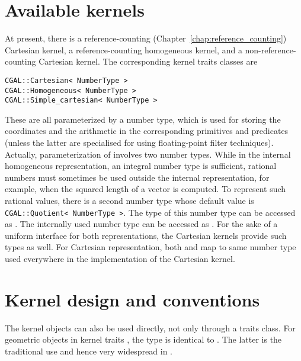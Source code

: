 \section{Available kernels}
At present, there is a reference-counting 
(Chapter~\ref{chap:reference_counting})
Cartesian kernel, a 
reference-counting homogeneous kernel, and a non-reference-counting
Cartesian kernel. The corresponding kernel traits classes are
\begin{verbatim}
CGAL::Cartesian< NumberType >
CGAL::Homogeneous< NumberType >
CGAL::Simple_cartesian< NumberType >
\end{verbatim}
%
%
%
These are all parameterized by a number type, which is used for storing
the coordinates and the arithmetic in the corresponding primitives and
predicates (unless the latter are specialised for using floating-point
filter techniques). Actually, parameterization of  
involves two number types. While in the internal homogeneous representation,
an integral number type is sufficient, rational numbers must sometimes be
used outside the internal representation, for example, when the squared length 
of a vector is computed. To represent such rational values, there is a second
number type whose default value is {\tt CGAL::Quotient< NumberType >}. 
The type of this number type can be accessed as .%
The internally used number type can be accessed as .%
For the sake of a uniform interface for both representations, the
Cartesian kernels provide such types as well. For Cartesian representation,
both  and  map to same number type used everywhere in the
implementation of the Cartesian kernel.  

\section{Kernel design and conventions}
%
%
The kernel objects can also be used directly, not only through a traits class.
For geometric objects in kernel traits , the type 
 is identical to . 
The latter is the traditional use and hence very widespread in \cgal.

